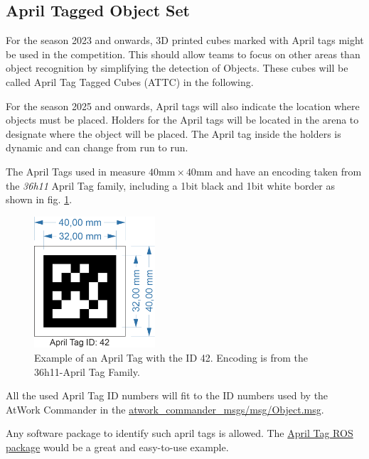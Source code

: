 \clearpage


\subsection{April Tagged Object Set}
\label{ssec: April Tagged Object Set}

For the season 2023 and onwards, 3D printed cubes marked with April tags might be used in the competition. 
This should allow teams to focus on other areas than object recognition by simplifying the detection of Objects. 
These cubes will be called April Tag Tagged Cubes (ATTC) in the following.

For the season 2025 and onwards, April tags will also indicate the location where objects must be placed. Holders for the April tags will be located in the arena to designate where the object will be placed. The April tag inside the holders is dynamic and can change from run to run. 

The April Tags used in \RCAW measure $40 \si{\milli\meter} \times 40 \si{\milli\meter}$ and have an encoding taken from the \textit{36h11} April Tag family, including a 1bit black and 1bit white border as shown in fig. \ref{fig:singleAprilTag}. 


\begin{figure}[h!]
	\centering
	\includegraphics[width= 0.4\textwidth ]{./images/singleAprilTAG42.png}
	\caption{Example of an April Tag with the ID 42. Encoding is from the 36h11-April Tag Family.}
	\label{fig:singleAprilTag}
\end{figure}

All the used April Tag ID numbers will fit to the ID numbers used by the AtWork Commander in the \href{https://github.com/robocup-at-work/atwork-commander/blob/master/atwork_commander_msgs/msg/Object.msg}{atwork\_commander\_msgs/msg/Object.msg}. 

Any software package to identify such april tags is allowed. The \href{http://wiki.ros.org/apriltag_ros}{April Tag ROS package} would be a great and easy-to-use example.


